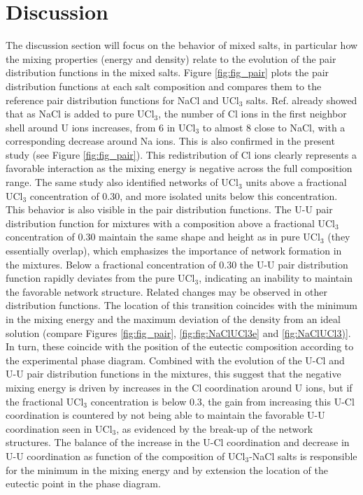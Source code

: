 \documentclass[preprint,3p,10pt,twocolumn,number,sort&compress]{elsarticle}
\begin{document}
\section{Discussion}
\label{sec:discussion}
The discussion section will focus on the behavior of mixed salts, in particular how the mixing properties (energy and density) relate to the evolution of the pair distribution functions in the mixed salts. Figure \ref{fig:fig_pair} plots the pair distribution functions at each salt composition and compares them to the reference pair distribution functions for NaCl and UCl$_3$ salts. 
Ref. \cite{} already showed that as NaCl is added to pure UCl$_3$, the number of Cl ions in the first neighbor shell around U ions increases, from 6 in UCl$_3$ to almost 8 close to NaCl, with a corresponding decrease around Na ions. This is also confirmed in the present study (see Figure \ref{fig:fig_pair}). This redistribution of Cl ions clearly represents a favorable interaction as the mixing energy is negative across the full composition range. The same study also identified networks of UCl$_3$ units above a fractional UCl$_3$ concentration of 0.30, and more isolated units below this concentration. This behavior is also visible in the pair distribution functions. The U-U pair distribution function for mixtures with a composition above a fractional UCl$_3$ concentration of 0.30 maintain the same shape and height as in pure UCl$_3$ (they essentially overlap), which emphasizes the importance of network formation in the mixtures. Below a fractional concentration of 0.30 the U-U pair distribution function rapidly deviates from the pure UCl$_3$, indicating an inability to maintain the favorable network structure. 
Related changes may be observed in other distribution functions. 
The location of this transition coincides with the minimum in the mixing energy and the maximum deviation of the density from an ideal solution (compare Figures \ref{fig:fig_pair},  \ref{fig:fig:NaClUCl3e} and \ref{fig:NaClUCl3)}. In turn, these coincide with the position of the eutectic composition according to the experimental phase diagram. Combined with the evolution of the U-Cl and U-U pair distribution functions in the mixtures, this suggest that the negative mixing energy is driven by increases in the Cl coordination around U ions, but if the fractional UCl$_3$ concentration is below 0.3, the gain from increasing this U-Cl coordination is countered by not being able to maintain the favorable U-U coordination seen in UCl$_3$, as evidenced by the break-up of the network structures. The balance of the increase in the U-Cl coordination and decrease in U-U coordination as function of the composition of UCl$_3$-NaCl salts is responsible for the minimum in the mixing energy and by extension the location of the eutectic point in the phase diagram. 
\end{document}

